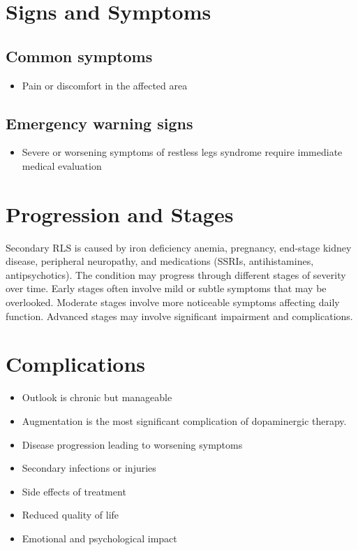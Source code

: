 \section{Signs and Symptoms}

\subsection{Common symptoms}
\begin{itemize}[noitemsep]
  \item Pain or discomfort in the affected area
  \end{itemize}

\subsection{Emergency warning signs}
\begin{itemize}[noitemsep]
  \item Severe or worsening symptoms of restless legs syndrome require immediate medical evaluation
\end{itemize}
\section{Progression and Stages}
Secondary RLS is caused by iron deficiency anemia, pregnancy, end-stage kidney disease, peripheral neuropathy, and medications (SSRIs, antihistamines, antipsychotics). The condition may progress through different stages of severity over time. Early stages often involve mild or subtle symptoms that may be overlooked. Moderate stages involve more noticeable symptoms affecting daily function. Advanced stages may involve significant impairment and complications.
\section{Complications}
\begin{itemize}[noitemsep]
  \item Outlook is chronic but manageable
  \item Augmentation is the most significant complication of dopaminergic therapy.
  \item Disease progression leading to worsening symptoms
  \item Secondary infections or injuries
  \item Side effects of treatment
  \item Reduced quality of life
  \item Emotional and psychological impact
\end{itemize}
